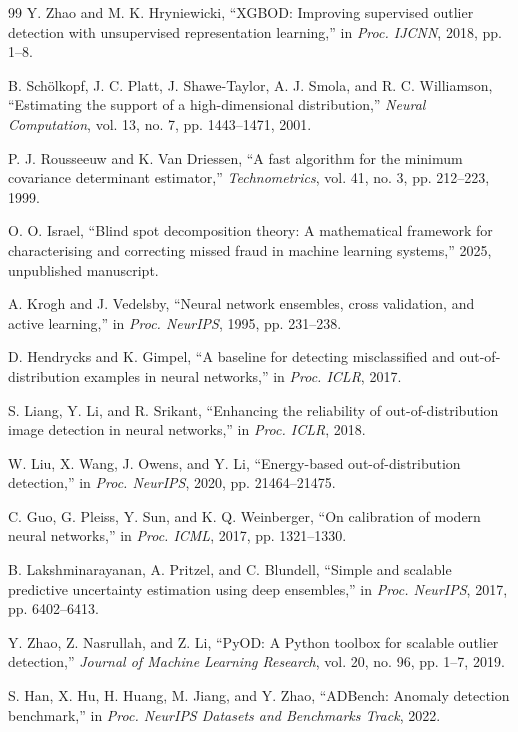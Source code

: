 \documentclass[journal]{IEEEtran}
\begin{document}
\begin{thebibliography}{99}
Y. Zhao and M. K. Hryniewicki, ``XGBOD: Improving supervised outlier detection with unsupervised representation learning,'' in \textit{Proc. IJCNN}, 2018, pp. 1--8.

B. Sch{\"o}lkopf, J. C. Platt, J. Shawe-Taylor, A. J. Smola, and R. C. Williamson, ``Estimating the support of a high-dimensional distribution,'' \textit{Neural Computation}, vol. 13, no. 7, pp. 1443--1471, 2001.

P. J. Rousseeuw and K. Van Driessen, ``A fast algorithm for the minimum covariance determinant estimator,'' \textit{Technometrics}, vol. 41, no. 3, pp. 212--223, 1999.

O. O. Israel, ``Blind spot decomposition theory: A mathematical framework for characterising and correcting missed fraud in machine learning systems,'' 2025, unpublished manuscript.

A. Krogh and J. Vedelsby, ``Neural network ensembles, cross validation, and active learning,'' in \textit{Proc. NeurIPS}, 1995, pp. 231--238.

D. Hendrycks and K. Gimpel, ``A baseline for detecting misclassified and out-of-distribution examples in neural networks,'' in \textit{Proc. ICLR}, 2017.

S. Liang, Y. Li, and R. Srikant, ``Enhancing the reliability of out-of-distribution image detection in neural networks,'' in \textit{Proc. ICLR}, 2018.

W. Liu, X. Wang, J. Owens, and Y. Li, ``Energy-based out-of-distribution detection,'' in \textit{Proc. NeurIPS}, 2020, pp. 21464--21475.

C. Guo, G. Pleiss, Y. Sun, and K. Q. Weinberger, ``On calibration of modern neural networks,'' in \textit{Proc. ICML}, 2017, pp. 1321--1330.

B. Lakshminarayanan, A. Pritzel, and C. Blundell, ``Simple and scalable predictive uncertainty estimation using deep ensembles,'' in \textit{Proc. NeurIPS}, 2017, pp. 6402--6413.

Y. Zhao, Z. Nasrullah, and Z. Li, ``PyOD: A Python toolbox for scalable outlier detection,'' \textit{Journal of Machine Learning Research}, vol. 20, no. 96, pp. 1--7, 2019.

S. Han, X. Hu, H. Huang, M. Jiang, and Y. Zhao, ``ADBench: Anomaly detection benchmark,'' in \textit{Proc. NeurIPS Datasets and Benchmarks Track}, 2022.

\end{thebibliography}
\end{document}
